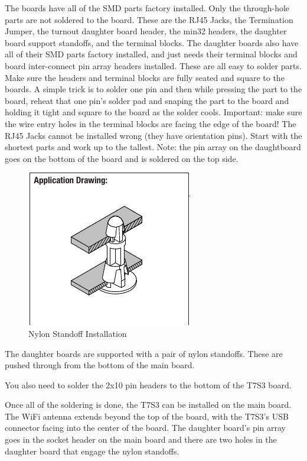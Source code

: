 The boards have all of the SMD parts factory installed. Only the through-hole
parts are not soldered to the board. These are the RJ45 Jacks, the Termination
Jumper, the turnout daughter board header, the min32 headers, the daughter
board support standoffs, and the terminal blocks. The daughter boards also
have all of their SMD parts factory installed, and just needs their terminal
blocks and board inter-connect pin array headers installed. These are all easy
to solder parts. Make sure the headers and terminal blocks are fully seated
and square to the boards. A simple trick is to solder one pin and then while
pressing the part to the board, reheat that one pin's solder pad and snaping
the part to the board and holding it tight and square to the board as the
solder cools. Important: make sure the wire entry holes in the terminal blocks
are facing the edge of the board! The RJ45 Jacks cannot be installed wrong
(they have orientation pins). Start with the shortest parts and work up to the
tallest. Note: the pin array on the daughtboard goes on the bottom of the
board and is soldered on the top side.


\begin{figure}[hbpt]\begin{centering}%
\includegraphics{NylonStandoffInstall.png}
\caption{Nylon Standoff Installation}
\end{centering}\end{figure}

The daughter boards are supported with a pair of nylon standoffs.  These are 
pushed through from the bottom of the main board.

You also need to solder the 2x10 pin headers to the bottom of the T7S3 board.


Once all of the soldering is done, the T7S3 can be installed on the main board.
The WiFi antenna extends beyond the top of the board, with the T7S3's USB 
connector facing into the center of the board.  The daughter board's pin array 
goes in the socket header on the main board and there are two holes in the 
daughter board that engage the nylon standoffs.


\clearpage
